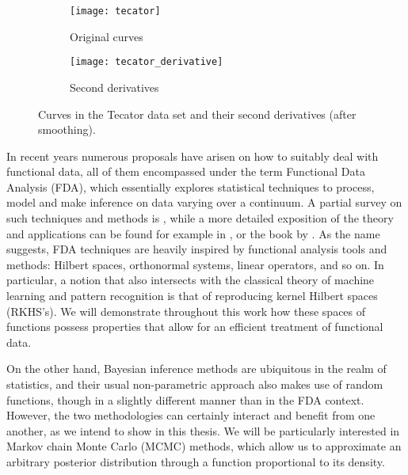 \begin{figure}[ht!]
  \begin{subfigure}[b]{0.48\textwidth}
    \texttt{[image: tecator]}
    \caption{Original curves}\label{fig:tecator_orig}
  \end{subfigure}
  \hfill
  \begin{subfigure}[b]{0.48\textwidth}
    \texttt{[image: tecator\_derivative]}
    \caption{Second derivatives}\label{fig:tecator_derivatives}
  \end{subfigure}
  \caption{Curves in the Tecator data set and their second derivatives (after smoothing).}\label{fig:tecator}
\end{figure}

In recent years numerous proposals have arisen on how to suitably deal with functional data, all of them encompassed under the term Functional Data Analysis (FDA), which essentially explores statistical techniques to process, model and make inference on data varying over a continuum. A partial survey on such techniques and methods is \citet{cuevas2014partial}, while a more detailed exposition of the theory and applications can be found for example in \citet{ramsay2005functional}, \citet{hsing2015theoretical} or the book by \citet{horvath2012inference}. As the name suggests, FDA techniques are heavily inspired by functional analysis tools and methods: Hilbert spaces, orthonormal systems, linear operators, and so on. In particular, a notion that also intersects with the classical theory of machine learning and pattern recognition is that of reproducing kernel Hilbert spaces (RKHS's). We will demonstrate throughout this work how these spaces of functions possess properties that allow for an efficient treatment of functional data.

On the other hand, Bayesian inference methods are ubiquitous in the realm of statistics, and their usual non-parametric approach also makes use of random functions, though in a slightly different manner than in the FDA context. However, the two methodologies can certainly interact and benefit from one another, as we intend to show in this thesis. We will be particularly interested in Markov chain Monte Carlo (MCMC) methods, which allow us to approximate an arbitrary posterior distribution through a function proportional to its density.

\begin{center}
\color{teal}\FourStar
\end{center}

